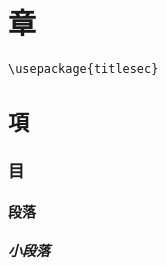 \section{章}

\begin{verbatim}
\usepackage{titlesec}
\end{verbatim}


\subsection{項}


\subsubsection{目}


\paragraph{段落}


\subparagraph{小段落}

